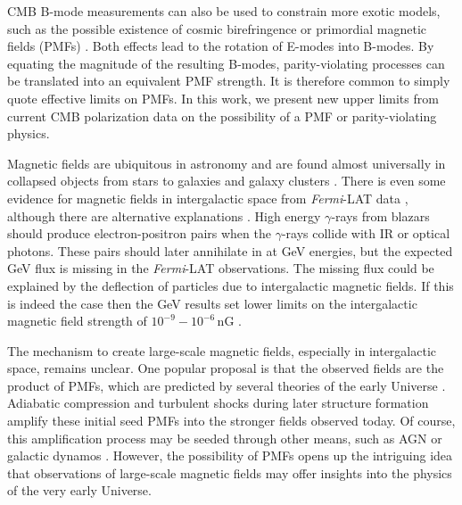 \documentclass[apj]{emulateapj}
\newcommand{\fermilat}{\textit{Fermi}-LAT}
\begin{document}
CMB B-mode measurements can also be used to constrain more exotic models, such as the possible existence of cosmic birefringence \citep{carroll98,lue99} or primordial magnetic fields (PMFs) \citep{kosowsky96, seshadri01}.  
Both effects lead to the rotation of E-modes into B-modes. 
By equating the magnitude of the resulting B-modes, parity-violating processes can be translated into an equivalent PMF strength. 
It is therefore common to simply quote effective limits on PMFs. 
In this work, we present new upper limits from current CMB polarization data on the possibility of a PMF or parity-violating physics. 

Magnetic fields are ubiquitous in astronomy and are found almost universally in collapsed objects from stars to galaxies and galaxy clusters \citep[for a review, see][]{ryu12, widrow12}. 
There is even some evidence for magnetic fields in intergalactic space from \fermilat{} data \citep{neronov10}, although there are alternative explanations \citep{broderick12}. 
High energy $\gamma$-rays from blazars should  produce electron-positron pairs when the $\gamma$-rays collide with IR or optical photons. 
These pairs should later annihilate in at GeV energies, but the expected GeV flux is missing in the \fermilat{} observations. 
The missing flux could be explained by the deflection of particles due to intergalactic magnetic fields. 
If this is indeed the case then the GeV results set lower limits on the intergalactic magnetic field strength of $10^{-9} - 10^{-6}$\,nG \citep{tavecchio10,taylor11,dermer11,vovk12}. 


The mechanism to create large-scale magnetic fields, especially in intergalactic space, remains unclear. 
One popular proposal is that the observed fields are the product of PMFs, which are predicted by several theories of the early Universe \citep[e.g.,][]{turner88, grasso98,ichiki06}. 
Adiabatic compression and turbulent shocks during later structure formation amplify these initial seed PMFs into the stronger fields observed today. 
Of course, this amplification process may be seeded through other means, such as AGN or galactic dynamos \citep[for a review, see][]{giovannini04}. 
However, the possibility of PMFs opens up the intriguing idea that observations of large-scale magnetic fields may offer insights into the physics of the very early Universe. 
\end{document}
